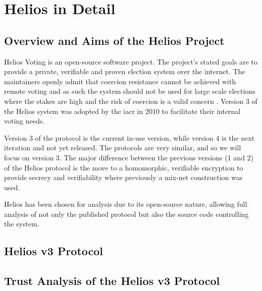 
\chapter{Helios in Detail}
\label{ch:helios}

\section{Overview and Aims of the Helios Project}
\label{ch:helios:aims}

Helios Voting is an open-source software project. The project's stated goals are to provide a private, verifiable and proven election system over the internet. The maintainers openly admit that coercion resistance cannot be achieved with remote voting and as such the system should not be used for large scale elections where the stakes are high and the risk of coercion is a valid concern \cite{HeliosVotingFAQ}. Version 3 of the Helios system was adopted by the \gls{iacr} \cite{HeliosCryptographers2010} in 2010 to facilitate their internal voting needs.

Version 3 of the protocol is the current in-use version, while version 4 is the next iteration and not yet released. The protocols are very similar, and so we will focus on version 3. The major difference between the previous versions (1 and 2) of the Helios protocol is the move to a homomorphic, verifiable encryption to provide secrecy and verifiability where previously a mix-net construction was used.

Helios has been chosen for analysis due to its open-source nature, allowing full analysis of not only the published protocol but also the source code controlling the system.




\section{Helios v3 Protocol}
\label{ch:helios:v3}


\section{Trust Analysis of the Helios v3 Protocol}
\label{ch:helios:trust}

